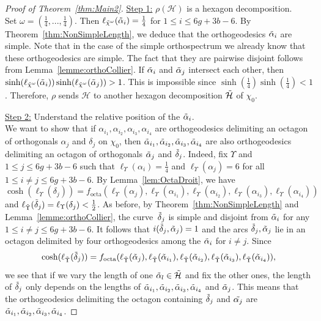 \documentclass[a4paper,12pt]{article}
\theoremstyle{definition}
\theoremstyle{remark}
\begin{document}
\begin{proof}[Proof of Theorem~\ref{thm:Main2}]
    \underline{Step 1:} $\rho(\mathcal{H})$ is a hexagon decomposition.\\
    Set $\omega=(\frac{1}{4},...,\frac{1}{4})$. Then $\ell_{\Tilde{\chi}^{\omega}} (\Tilde{\alpha}_i)=\frac{1}{4}$ for $1 \leqslant i \leqslant 6g+3b-6$. By Theorem~\ref{thm:NonSimpleLength}, we deduce that the orthogeodesics $\Tilde{\alpha}_i$ are simple. Note that in the case of the simple orthospectrum we already know that these orthogeodesics are simple. The fact that they are pairwise disjoint follows from Lemma~\ref{lemme:orthoCollier}. If $\Tilde{\alpha}_i$ and $\Tilde{\alpha}_j$ intersect each other, then \mbox{$\sinh(\ell_{\Tilde{\chi}^{\omega}} (\Tilde{\alpha}_i))\sinh (\ell_{\Tilde{\chi}^{\omega}} (\Tilde{\alpha}_j)) > 1$}. This is impossible since $\sinh(\frac{1}{4})\sinh(\frac{1}{4}) <1$. Therefore, $\rho$ sends $\mathcal{H}$ to another hexagon decomposition $\Tilde{\mathcal{H}}$ of $\chi_0$. 

    \underline{Step 2:} Understand the relative position of the $\Tilde{\alpha}_i$.\\
    We want to show that if $\alpha_{i_1}, \alpha_{i_2}, \alpha_{i_3}, \alpha_{i_4}$ are orthogeodesics delimiting an octagon of orthogonals $\alpha_j$ and $\delta_j$ on $\chi_0$, then $\Tilde{\alpha}_{i_1}, \Tilde{\alpha}_{i_2}, \Tilde{\alpha}_{i_3}, \Tilde{\alpha}_{i_4}$ are also orthogeodesics delimiting an octagon of orthogonals $\Tilde{\alpha}_j$ and $\Tilde{\delta}_j$. Indeed, fix $\Upsilon$ and $1 \leqslant j \leqslant 6g+3b-6$ such that $\ell_{\Upsilon} (\alpha_i) = \frac{1}{4}$ and $\ell_{\Upsilon} (\alpha_j) = 6$ for all $1 \leqslant i\neq j \leqslant 6g+3b-6$. By Lemma~\ref{lem:OctaDroit}, we have
    \[
        \cosh(\ell_{\Upsilon} (\delta_j)) =f_{\mathrm{octa}}(\ell_{\Upsilon} (\alpha_j), \ell_{\Upsilon} (\alpha_{i_1}),\ell_{\Upsilon} (\alpha_{i_2}),\ell_{\Upsilon} (\alpha_{i_3}), \ell_{\Upsilon} (\alpha_{i_4} ))
    \]
    and $\ell_{\Tilde{\Upsilon}} (\Tilde{\delta}_j)=\ell_{\Upsilon} (\delta_j) < \frac{1}{2}$. As before, by Theorem~\ref{thm:NonSimpleLength} and Lemma~\ref{lemme:orthoCollier}, the curve~$\Tilde{\delta}_j$ is simple and disjoint from $\Tilde{\alpha}_i$ for any $1 \leqslant i\neq j \leqslant 6g+3b-6$. It follows that $i(\Tilde{\delta}_j,\Tilde{\alpha}_j)=1$ and the arcs $\Tilde{\delta}_j, \Tilde{\alpha}_j$ lie in an octagon delimited by four orthogeodesics among the $\Tilde{\alpha}_i$ for $i \neq j$. Since
    \[
        \cosh(\ell_{\Tilde{\Upsilon}} (\Tilde{\delta}_j)) =f_{\mathrm{octa}}(\ell_{\Tilde{\Upsilon}} (\Tilde{\alpha}_j), \ell_{\Tilde{\Upsilon}} (\Tilde{\alpha}_{i_1}),\ell_{\Tilde{\Upsilon}} (\Tilde{\alpha}_{i_2}),\ell_{\Tilde{\Upsilon}} (\Tilde{\alpha}_{i_3}), \ell_{\Tilde{\Upsilon}} (\Tilde{\alpha}_{i_4}) ),
    \]
    we see that if we vary the length of one $\Tilde{\alpha}_l \in \Tilde{\mathcal{H}}$ and fix the other ones, the length of $\Tilde{\delta}_j$ only depends on the lengths of $\Tilde{\alpha}_{i_1},\Tilde{\alpha}_{i_2},\Tilde{\alpha}_{i_3},\Tilde{\alpha}_{i_4}$ and $\Tilde{\alpha}_j$. This means that the orthogeodesics delimiting the octagon containing $\Tilde{\delta}_j$ and $\Tilde{\alpha_j}$ are $\Tilde{\alpha}_{i_1},\Tilde{\alpha}_{i_2},\Tilde{\alpha}_{i_3},\Tilde{\alpha}_{i_4}$. 
    

\end{proof}
\end{document}
